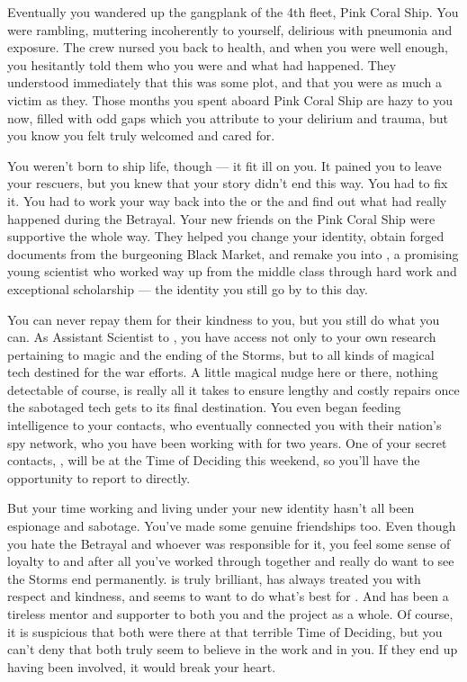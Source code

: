 \documentclass[char]{GL2020}
\begin{document}
Eventually you wandered up the gangplank of the 4th fleet, Pink Coral Ship. You were rambling, muttering incoherently to yourself, delirious with pneumonia and exposure. The crew nursed you back to health, and when you were well enough, you hesitantly told them who you were and what had happened. They understood immediately that this was some plot, and that you were as much a victim as they. Those months you spent aboard Pink Coral Ship are hazy to you now, filled with odd gaps which you attribute to your delirium and trauma, but you know you felt truly welcomed and cared for.

You weren't born to ship life, though — it fit ill on you. It pained you to leave your rescuers, but you knew that your story didn't end this way. You had to fix it. You had to work your way back into the \pFarm{} or the \pTech{} and find out what had really happened during the Betrayal. Your new friends on the Pink Coral Ship were supportive the whole way. They helped you change your identity, obtain forged documents from the burgeoning Black Market, and remake you into \cAssistantScientist{\full}, a promising young \pTech{} scientist who worked \cAssistantScientist{\their} way up from the middle class through hard work and exceptional scholarship — the identity you still go by to this day. 

You can never repay them for their kindness to you, but you still do what you can. As Assistant Scientist to \cHeadScientist{\full}, you have access not only to your own research pertaining to magic and the ending of the Storms, but to all kinds of magical tech destined for the war efforts. A little magical nudge here or there, nothing detectable of course, is really all it takes to ensure lengthy and costly repairs once the sabotaged tech gets to its final destination. You even began feeding intelligence to your \pShip{} contacts, who eventually connected you with their nation’s spy network, who you have been working with for two years. One of your secret contacts, \cBunker{}, will be at the Time of Deciding this weekend, so you'll have the opportunity to report to \cBunker{\them} directly.

But your time working and living under your new identity hasn’t all been espionage and sabotage. You’ve made some genuine friendships too. Even though you hate the Betrayal and whoever was responsible for it, you feel some sense of loyalty to \cHeadScientist{} and \cDiplomat{\full} after all you've worked through together and really do want to see the Storms end permanently. \cHeadScientist{} is truly brilliant, has always treated you with respect and kindness, and seems to want to do what’s best for \pEarth{}. And \cDiplomat{} has been a tireless mentor and supporter to both you and the project as a whole. Of course, it is suspicious that both were there at that terrible Time of Deciding, but you can’t deny that both truly seem to believe in the work and in you. If they end up having been involved, it would break your heart.
\end{document}
